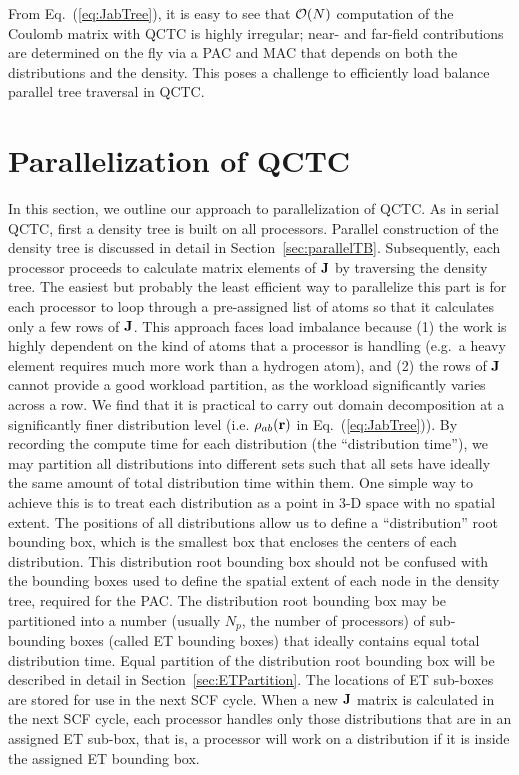 \commentoutA{\documentclass[prl,aps,twocolumn,twocolumngrid,superbib]{revtex4}}
\begin{document}
From Eq.~(\ref{eq:JabTree}), it is easy to see that ${\cal O}(N)$
computation of the Coulomb matrix with QCTC is highly irregular; near- and
far-field contributions are determined on the fly via a PAC and MAC
that depends on both the distributions and the density. This poses a
challenge to efficiently load balance parallel tree traversal in QCTC.

\section{Parallelization of QCTC}
In this section, we outline our approach 
to parallelization of QCTC.
As in serial QCTC, first a density tree is built
on all processors. Parallel construction of
the density tree is discussed in detail in
Section~\ref{sec:parallelTB}.
Subsequently, each processor proceeds to calculate
matrix elements of ${\bf J}$ by traversing the density tree.
The easiest but probably the least efficient 
way to parallelize this part is for each 
processor to loop through a pre-assigned list of atoms so that it calculates
only a few rows of ${\bf J}$. This approach faces
load imbalance because (1) the work is highly dependent on 
the kind of atoms that a processor
is handling (e.g.~a heavy element
requires much more work than a hydrogen atom),
and (2) the rows of ${\bf J}$ cannot provide a good
workload partition, as the workload significantly varies across
a row. 
We find that it is practical to carry out domain decomposition
at a significantly finer distribution level (i.e. $\rho_{ab}({\bf r})$ in
Eq.~(\ref{eq:JabTree})). 
By recording the compute time for each distribution (the ``distribution time''),
we may partition all distributions into different sets such that
all sets have ideally the same amount of total distribution time within
them. 
One simple way to achieve this is to treat
each distribution as a point in 3-D space with no spatial extent.
The positions of all distributions allow us to define
a ``distribution'' root bounding box, which is the smallest box that
encloses the centers of each distribution. 
This distribution root bounding box
should not be confused with the bounding boxes 
used to define the spatial extent of
each node in the density tree, required for the PAC\cite{CTymczak04a}. 
The distribution root bounding box
may be partitioned into a number (usually $N_p$, the number 
of processors) of sub-bounding boxes
(called ET bounding boxes)
that ideally contains equal total distribution time.
Equal partition of the distribution
root bounding box will be described in detail
in Section~\ref{sec:ETPartition}. 
The locations of ET sub-boxes are stored
for use in the next SCF cycle. When a new ${\bf J}$ 
matrix is calculated in the next SCF cycle,
each processor handles only those distributions that 
are in an assigned ET sub-box,
that is, a processor will work on a distribution if it is 
inside the assigned ET bounding box. 
\end{document}
